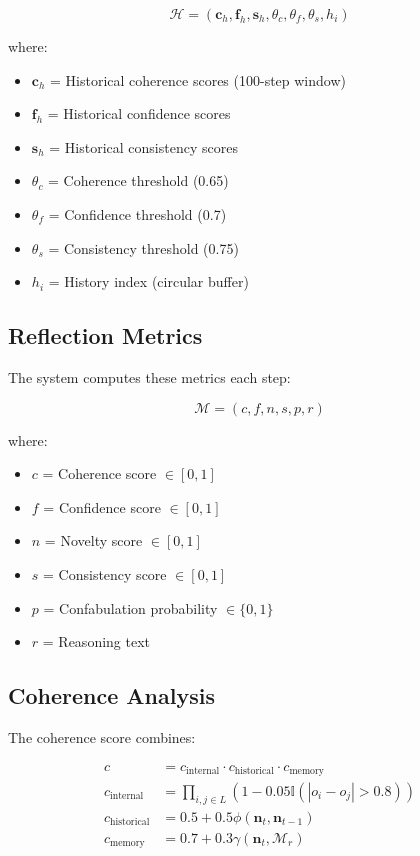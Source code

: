 \documentclass{article}
\begin{document}
\begin{equation}
\mathcal{H} = (\mathbf{c}_h, \mathbf{f}_h, \mathbf{s}_h, \theta_c, \theta_f, \theta_s, h_i)
\end{equation}

where:
\begin{itemize}[leftmargin=*]
\item $\mathbf{c}_h$ = Historical coherence scores (100-step window)
\item $\mathbf{f}_h$ = Historical confidence scores
\item $\mathbf{s}_h$ = Historical consistency scores
\item $\theta_c$ = Coherence threshold (0.65)
\item $\theta_f$ = Confidence threshold (0.7)
\item $\theta_s$ = Consistency threshold (0.75)
\item $h_i$ = History index (circular buffer)
\end{itemize}

\subsection{Reflection Metrics}
The system computes these metrics each step:

\begin{equation}
\mathcal{M} = (c, f, n, s, p, r)
\end{equation}

where:
\begin{itemize}[leftmargin=*]
\item $c$ = Coherence score $\in [0,1]$
\item $f$ = Confidence score $\in [0,1]$
\item $n$ = Novelty score $\in [0,1]$
\item $s$ = Consistency score $\in [0,1]$
\item $p$ = Confabulation probability $\in \{0,1\}$
\item $r$ = Reasoning text
\end{itemize}

\subsection{Coherence Analysis}
The coherence score combines:

\begin{align}
c &= c_{\text{internal}} \cdot c_{\text{historical}} \cdot c_{\text{memory}} \\
c_{\text{internal}} &= \prod_{i,j\in L} (1 - 0.05\mathbb{I}(|o_i-o_j|>0.8)) \\
c_{\text{historical}} &= 0.5 + 0.5\phi(\mathbf{n}_t, \mathbf{n}_{t-1}) \\
c_{\text{memory}} &= 0.7 + 0.3\gamma(\mathbf{n}_t, \mathcal{M}_r)
\end{align}
\end{document}
